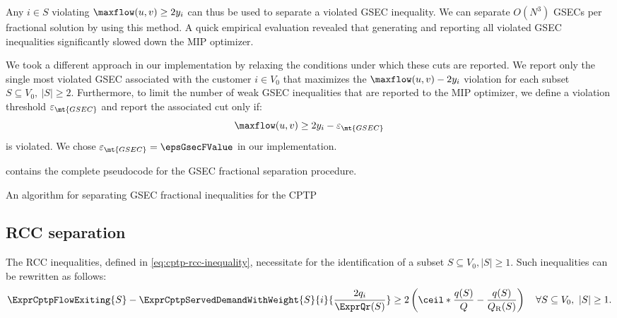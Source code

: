 Any $i \in S$ violating $\maxflow(u, v) \ge 2 y_i$ can thus be used to separate a violated GSEC inequality.
We can separate $O(N^3)$ GSECs per fractional solution by using this method.
A quick empirical evaluation revealed that generating
and reporting all violated GSEC inequalities significantly slowed down the MIP optimizer.

\medskip

We took a different approach in our implementation by relaxing the conditions
under which these cuts are reported.
We report only the single most violated GSEC
associated with the customer $i \in V_0$ that maximizes the $\maxflow(u, v) - 2 y_i$ violation
for each subset $S \subseteq V_0,\ |S| \ge 2$.
Furthermore, to limit the number of weak GSEC inequalities that are reported to the MIP optimizer,
we define a violation threshold $\varepsilon_{\mt{GSEC}}$ and report the associated cut only if:
\begin{equation}
	\maxflow(u, v) \ge 2 y_i - \varepsilon_{\mt{GSEC}}
\end{equation}
is violated.
We chose $\varepsilon_{\mt{GSEC}} = \epsGsecFValue$ in our implementation.

 contains the complete pseudocode for the GSEC fractional separation procedure.

\begin{algorithm}
	\caption{An algorithm for separating GSEC fractional inequalities for the CPTP}
	\label{algo:gsec-frac-sep}
	
\end{algorithm}

\subsection{RCC separation}
\label{sec:impl-rcc-separation}

The RCC inequalities, defined in \cref{eq:cptp-rcc-inequality},
necessitate for the identification of a subset $S \subseteq V_0, |S| \ge 1$.
Such inequalities can be rewritten as follows:
\begin{equation}
	\ExprCptpFlowExiting{S} - \ExprCptpServedDemandWithWeight{S}{i}{\frac{2 q_i}{\ExprQr(S)}}    \ge   2 \left( \ceil*{ \frac{q(S)}{Q}} - \frac{q(S)}{Q_{\mathrm{R}}(S)} \right) \quad \forall S \subseteq V_0,\ |S| \ge 1.
\end{equation}

